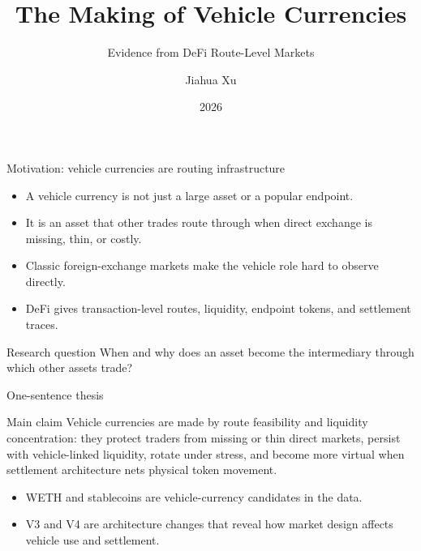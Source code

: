 \documentclass[aspectratio=169,11pt]{beamer}
\title{The Making of Vehicle Currencies}
\subtitle{Evidence from DeFi Route-Level Markets}
\author{Jiahua Xu}
\institute{Nanyang Technological University}
\date{2026}
\begin{document}
\begin{frame}
  \titlepage
\end{frame}

\begin{frame}{Motivation: vehicle currencies are routing infrastructure}
\begin{itemize}
  \item A vehicle currency is not just a large asset or a popular endpoint.
  \item It is an asset that other trades route through when direct exchange is missing, thin, or costly.
  \item Classic foreign-exchange markets make the vehicle role hard to observe directly.
  \item DeFi gives transaction-level routes, liquidity, endpoint tokens, and settlement traces.
\end{itemize}
\vspace{0.4em}
\begin{block}{Research question}
When and why does an asset become the intermediary through which other assets trade?
\end{block}
\end{frame}

\begin{frame}{One-sentence thesis}
\begin{block}{Main claim}
Vehicle currencies are made by route feasibility and liquidity concentration: they protect traders from missing or thin direct markets, persist with vehicle-linked liquidity, rotate under stress, and become more virtual when settlement architecture nets physical token movement.
\end{block}
\vspace{0.8em}
\begin{itemize}
  \item WETH and stablecoins are vehicle-currency candidates in the data.
  \item V3 and V4 are architecture changes that reveal how market design affects vehicle use and settlement.
\end{itemize}
\end{frame}
\end{document}
